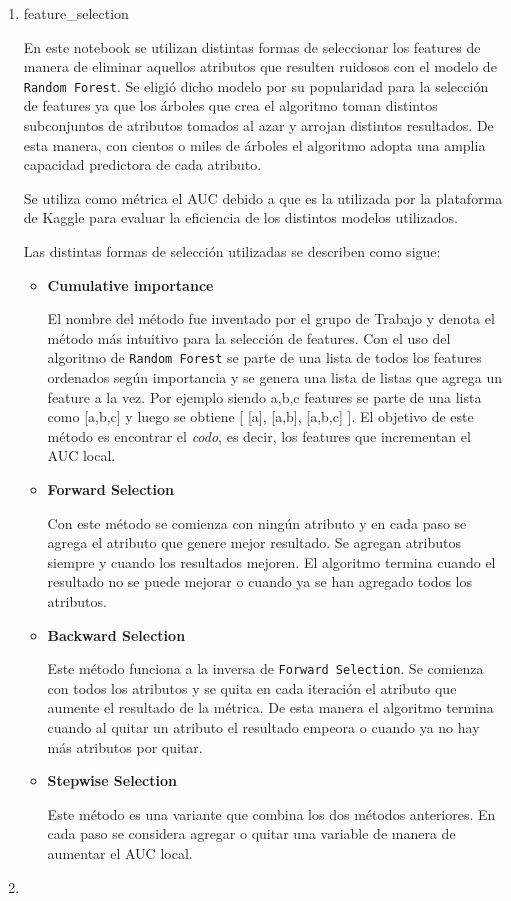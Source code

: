 \documentclass[a4paper]{article}
\begin{document}
\begin{enumerate}
\item feature\_selection

En este notebook se utilizan distintas formas de seleccionar los features de manera de eliminar aquellos atributos que resulten ruidosos con el modelo de \texttt{Random Forest}. Se eligió dicho modelo por su popularidad para la selección de features ya que los árboles que crea el algoritmo toman distintos subconjuntos de atributos tomados al azar y arrojan distintos resultados. De esta manera, con cientos o miles de árboles el algoritmo adopta una amplia capacidad predictora de cada atributo.

Se utiliza como métrica el AUC debido a que es la utilizada por la plataforma de Kaggle para evaluar la eficiencia de los distintos modelos utilizados. 

Las distintas formas de selección utilizadas se describen como sigue:

\begin {itemize}
\item \textbf{Cumulative importance}

El nombre del método fue inventado por el grupo de Trabajo y denota el método más intuitivo para la selección de features. Con el uso del algoritmo de \texttt{Random Forest} se parte de una lista de todos los features ordenados según importancia y se genera una lista de listas que agrega un feature a la vez. Por ejemplo siendo a,b,c features se parte de una lista como [a,b,c] y luego se obtiene  [ [a], [a,b], [a,b,c] ]. El objetivo de este método es encontrar el 
\textit{codo}, es decir, los features que incrementan el AUC local.

\item \textbf{Forward Selection}

Con este método se comienza con ningún atributo y en cada paso se agrega el atributo que genere mejor resultado. Se agregan atributos siempre y cuando los resultados mejoren. El algoritmo termina cuando el resultado no se puede mejorar o cuando ya se han agregado todos los atributos.

\item \textbf{Backward Selection}

Este método funciona a la inversa de \texttt{Forward Selection}. Se comienza con todos los atributos y se quita en cada iteración el atributo que aumente el resultado de la métrica. De esta manera el algoritmo termina cuando al quitar un atributo el resultado empeora o cuando ya no hay más atributos por quitar.

\item \textbf{Stepwise Selection}

Este método es una variante que combina los dos métodos anteriores. En cada paso se considera agregar o quitar una variable de manera de aumentar el AUC local.	

\end {itemize}


\item 


\end{enumerate}
\end{document}
